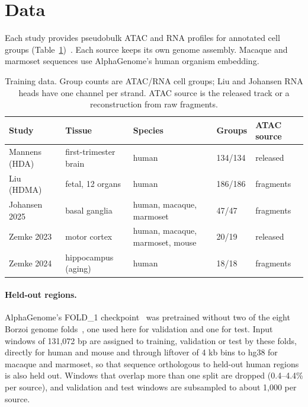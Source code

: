 \documentclass[11pt]{article}
\begin{document}
\section{Data}
Each study provides pseudobulk ATAC and RNA profiles for annotated cell groups
(Table~\ref{tab:data})~\cite{mannens2024,liu2026,johansen2025,zemke2023,zemke2026}. Each source keeps its own genome assembly. Macaque and
marmoset sequences use AlphaGenome's human organism embedding.

\begin{table}[ht]
\centering
\footnotesize
\caption{Training data. Group counts are ATAC/RNA cell groups; Liu and
Johansen RNA heads have one channel per strand. ATAC source is the released
track or a reconstruction from raw fragments.}
\label{tab:data}
\begin{tabular}{@{}lllll@{}}
\toprule
Study & Tissue & Species & Groups & ATAC source \\
\midrule
Mannens (HDA)~\cite{mannens2024} & first-trimester brain & human & 134/134 & released \\
Liu (HDMA)~\cite{liu2026} & fetal, 12 organs & human & 186/186 & fragments \\
Johansen 2025~\cite{johansen2025} & basal ganglia & human, macaque, marmoset & 47/47 & fragments \\
Zemke 2023~\cite{zemke2023} & motor cortex & human, macaque, marmoset, mouse & 20/19 & released \\
Zemke 2024~\cite{zemke2026} & hippocampus (aging) & human & 18/18 & fragments \\
\bottomrule
\end{tabular}
\end{table}

\paragraph{Held-out regions.} AlphaGenome's FOLD\_1 checkpoint~\cite{avsec2026} was
pretrained without two of the eight Borzoi genome folds~\cite{linder2025}, one
used here for validation and one for test. Input windows of 131,072 bp are assigned to training, validation
or test by these folds, directly for human and mouse and through liftover of
4 kb bins to hg38 for macaque and marmoset, so that sequence orthologous to
held-out human regions is also held out. Windows that overlap more than one
split are dropped (0.4--4.4\% per source), and validation and test windows are
subsampled to about 1,000 per source.
\end{document}
